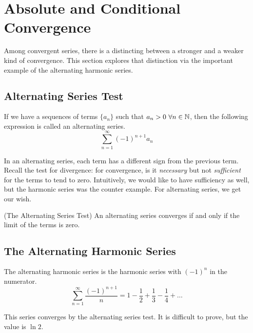 \documentclass[fleqn,letterpaper]{report}
\begin{document}
\section{Absolute and Conditional Convergence}
\label{absolute-convergence}

Among convergent series, there is a distincting between a
stronger and a weaker kind of convergence. This section
explores that distinction via the important example of the
alternating harmonic series.

\subsection{Alternating Series Test}
\label{alternating-series-test}

\begin{defn}
If we have a sequences of terms $\{a_n\}$ such that $a_n>0 \
\forall n \in \mathbb{N}$, then the following expression is called an
alternating series.
\begin{equation*}
\sum_{n=1}^\infty (-1)^{n+1} a_n 
\end{equation*}
\end{defn}

In an alternating series, each term has a different sign from
the previous term. Recall the test for divergence: for
convergence, is it \emph{necessary} but not \emph{sufficient}
for the terms to tend to zero. Intuitively, we would like to
have sufficiency as well, but the harmonic series was the
counter example. For alternating series, we get our wish. 

\begin{prop}(The Alternating Series Test) An alternating
series converges if and only if the limit of the terms
is zero.
\end{prop}

\subsection{The Alternating Harmonic Series}
\label{alternating-harmoinc-series}

\begin{defn}
The alternating harmonic series is the harmonic series with
$(-1)^n$ in the numerator.
\begin{equation*}
\sum_{n=1}^\infty \frac{(-1)^{n+1}}{n} = 1 - \frac{1}{2} +
\frac{1}{3} - \frac{1}{4} + \ldots
\end{equation*}\end{defn}
This series converges by the alternating series test. 
It is difficult to prove, but the value is $\ln 2$. 
\end{document}
